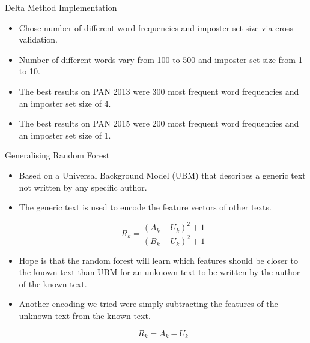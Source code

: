 \documentclass[10pt]{beamer}
\begin{document}
\begin{frame}[fragile]{Delta Method Implementation}

    \begin{itemize}
        \item Chose number of different word frequencies and imposter set size
            via cross validation.
        \item Number of different words vary from 100 to 500 and imposter set
            size from 1 to 10.
        \item The best results on PAN 2013 were 300 most frequent word
            frequencies and an imposter set size of 4.
        \item The best results on PAN 2015 were 200 most frequent word
            frequencies and an imposter set size of 1.
    \end{itemize}

\end{frame}

\begin{frame}[fragile]{Generalising Random Forest}

    \begin{itemize}
        \item Based on a Universal Background Model (UBM) that describes a
            generic text not written by any specific author.
        \item The generic text is used to encode the feature vectors of other
            texts.

            \begin{equation}
                R_k = \frac{(A_k - U_k)^2 + 1}{(B_k - U_k)^2 + 1}
            \end{equation}
        \item Hope is that the random forest will learn which features should be
            closer to the known text than UBM for an unknown text to be written
            by the author of the known text.
        \item Another encoding we tried were simply subtracting the features of
            the unknown text from the known text.

            \begin{equation}
                R_k = A_k - U_k
            \end{equation}
    \end{itemize}

\end{frame}
\end{document}
